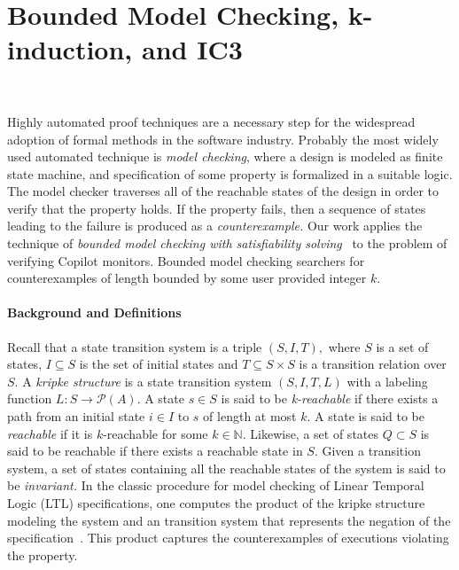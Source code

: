 \section{Bounded Model Checking,  k-induction, and IC3}~\label{sec:mck}


Highly automated proof techniques are a necessary step for the
widespread adoption of formal methods in the software industry.
Probably the most widely used automated technique is {\em model
  checking}, where a design is modeled as finite state machine, and
specification of some property is formalized in a suitable logic.  The
model checker traverses all of the 
reachable states of the design in order to verify that the property
holds.  If the property fails, then a sequence of states leading to
the failure is produced as a {\em counterexample.} Our work applies
the technique of {\em bounded model checking with satisfiability
  solving}~\cite{ClarkeBounded01,ClarkeBounded03} to the problem of
verifying Copilot monitors. Bounded model checking searchers for
counterexamples of length bounded by some user provided integer $k.$


\paragraph{Background and Definitions} Recall that a state transition system is a triple $(S,I,T),$
where $S$ is a set of states, $I \subseteq S$ is the set of initial
states and $T \subseteq S \times S $ is a transition relation over $S.$ A {\em kripke
  structure} is a state transition system $(S,I,T,L)$  with a labeling function
$L: S \rightarrow  \mathcal{P}(A)$.  A state $s 
\in S$ is said to be {\em k-reachable} if there exists a path from an
initial state $i\in I$ to $s$ of length at most $k.$ A state is said
to be {\em reachable} if it is $k$-reachable for some $k\in \mathbb{N}.$
Likewise, a set of states $Q \subset S$ is said to be reachable if
there exists a reachable state in $S.$  Given a transition system, a
set of states containing all the reachable states of the system is
said to be {\em invariant.} In the classic procedure for model checking of Linear
Temporal Logic (LTL) specifications, one computes the product of
the kripke structure modeling the system and an transition system that
represents the negation of the specification~\cite{ClarkeMC}. This product captures
the counterexamples of executions violating the property. 


